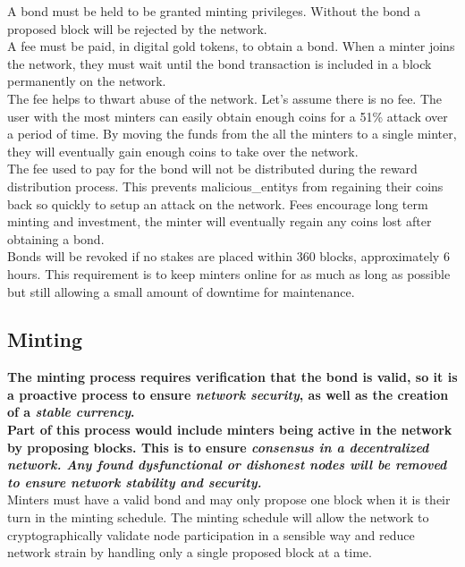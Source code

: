 \documentclass[12pt,a4paper]{article}
\begin{document}
  A \gls{bond} must be held to be granted minting privileges. Without the bond a
  proposed block will be rejected by the network.\\

  A fee must be paid, in digital gold tokens, to obtain a bond. When a minter
  joins the network, they must wait until the bond transaction is included in a
  block permanently on the network.\\

  The fee helps to thwart abuse of the network. Let's assume there is no fee.
  The user with the most minters can easily obtain enough coins for a 51\%
  attack over a period of time. By moving the funds from the all the minters to
  a single minter, they will eventually gain enough coins to take over the
  network.\\

  The fee used to pay for the bond will not be distributed during the reward
  distribution process. This prevents \glspl{malicious_entity} from regaining
  their coins back so quickly to setup an attack on the network. Fees encourage
  long term minting and investment, the minter will eventually regain any coins
  lost after obtaining a bond.\\

  Bonds will be revoked if no stakes are placed within 360 blocks, approximately
  6 hours. This requirement is to keep minters online for as much as long as
  possible but still allowing a small amount of downtime for maintenance.

  \subsection{Minting}
  \textbf{The minting process requires verification that the bond is valid, so
  it is a proactive process to ensure \textit{network security}, as well as the
  creation of a \textit{stable currency}.}\\

  \textbf{Part of this process would include minters being active in the network
  by proposing blocks. This is to ensure \textit{consensus in a decentralized
  network. Any found dysfunctional or dishonest nodes will be removed to ensure
  network stability and security.}}\\

  Minters must have a valid bond and may only propose one block when it is their
  turn in the minting schedule. The minting schedule will allow the network to
  cryptographically validate node participation in a sensible way and reduce
  network strain by handling only a single proposed block at a time.\\
\end{document}
